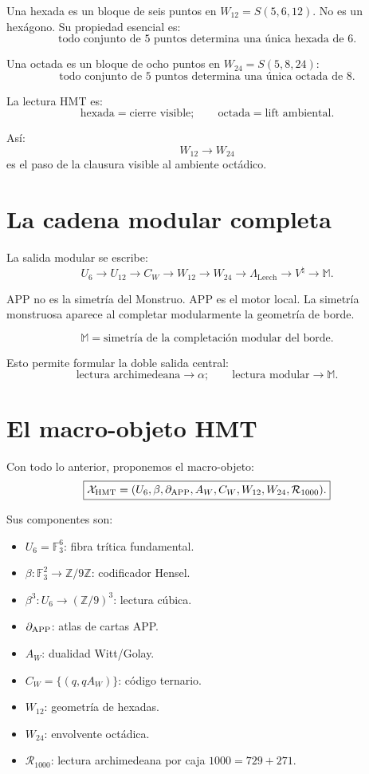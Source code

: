 \documentclass[11pt,a4paper]{article}
\theoremstyle{definition}
\theoremstyle{remark}
\newcommand{\F}{\mathbb F}
\newcommand{\Z}{\mathbb Z}
\newcommand{\Leech}{\Lambda_{\mathrm{Leech}}}
\newcommand{\Vnat}{V^{\natural}}
\newcommand{\Monster}{\mathbb M}
\newcommand{\Rread}{\mathcal R_{1000}}
\begin{document}
Una hexada es un bloque de seis puntos en \(W_{12}=S(5,6,12)\). No es un hexágono. Su propiedad esencial es:
\[
\boxed{
\text{todo conjunto de 5 puntos determina una única hexada de 6.}
}
\]

Una octada es un bloque de ocho puntos en \(W_{24}=S(5,8,24)\):
\[
\boxed{
\text{todo conjunto de 5 puntos determina una única octada de 8.}
}
\]

La lectura HMT es:
\[
\boxed{
\text{hexada}=\text{cierre visible};\qquad \text{octada}=\text{lift ambiental}.
}
\]

Así:
\[
W_{12}\to W_{24}
\]
es el paso de la clausura visible al ambiente octádico.

\section{La cadena modular completa}

La salida modular se escribe:
\[
\boxed{
U_6\to U_{12}\to C_W\to W_{12}\to W_{24}\to\Leech\to\Vnat\to\Monster.
}
\]

APP no es la simetría del Monstruo. APP es el motor local. La simetría monstruosa aparece al completar modularmente la geometría de borde.

\[
\boxed{
\Monster=\text{simetría de la completación modular del borde}.}
\]

Esto permite formular la doble salida central:
\[
\boxed{
\text{lectura archimedeana}\to\alpha;
\qquad
\text{lectura modular}\to\Monster.
}
\]

\section{El macro-objeto HMT}

Con todo lo anterior, proponemos el macro-objeto:
\[
\boxed{
\mathcal X_{\rm HMT}=(U_6,\beta,\partial_{\rm APP},A_W,C_W,W_{12},W_{24},\Rread).
}
\]

Sus componentes son:
\begin{itemize}[leftmargin=2em]
\item \(U_6=\F_3^6\): fibra trítica fundamental.
\item \(\beta:\F_3^2\to\Z/9\Z\): codificador Hensel.
\item \(\beta^3:U_6\to(\Z/9)^3\): lectura cúbica.
\item \(\partial_{\rm APP}\): atlas de cartas APP.
\item \(A_W\): dualidad Witt/Golay.
\item \(C_W=\{(q,qA_W)\}\): código ternario.
\item \(W_{12}\): geometría de hexadas.
\item \(W_{24}\): envolvente octádica.
\item \(\Rread\): lectura archimedeana por caja \(1000=729+271\).
\end{itemize}
\end{document}
